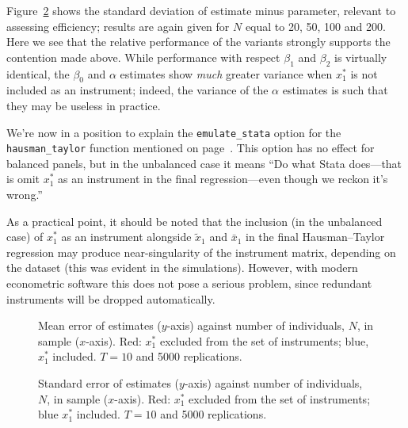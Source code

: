 \documentclass{article}
\begin{document}
Figure~\ref{fig:sds} shows the standard deviation of estimate minus
parameter, relevant to assessing efficiency; results are again given
for $N$ equal to 20, 50, 100 and 200.  Here we see that the relative
performance of the variants strongly supports the contention made
above. While performance with respect $\beta_1$ and $\beta_2$ is
virtually identical, the $\beta_0$ and $\alpha$ estimates show
\textit{much} greater variance when $x_1^*$ is not included as an
instrument; indeed, the variance of the $\alpha$ estimates is
such that they may be useless in practice.

We're now in a position to explain the \texttt{emulate\_stata} option
for the \texttt{hausman\_taylor} function mentioned on
page~\pageref{stata1}.\label{stata2} This option has no effect for
balanced panels, but in the unbalanced case it means ``Do what Stata
does---that is omit $x_1^*$ as an instrument in the final
regression---even though we reckon it's wrong.''

As a practical point, it should be noted that the inclusion (in the
unbalanced case) of $x_1^*$ as an instrument alongside $\tilde{x}_1$
and $\bar{x}_1$ in the final Hausman--Taylor regression may produce
near-singularity of the instrument matrix, depending on the dataset
(this was evident in the simulations). However, with modern
econometric software this does not pose a serious problem, since
redundant instruments will be dropped automatically.


\begin{figure}[p]
  \centering

\caption{Mean error of estimates ($y$-axis) against number of individuals,
$N$, in sample ($x$-axis).
{\color{red} Red}: $x_1^*$ excluded from the set of instruments;
{\color{blue} blue}, $x_1^*$ included.
$T = 10$ and 5000 replications.}
\label{fig:means}
\end{figure}

\begin{figure}[p]
  \centering

\caption{Standard error of estimates ($y$-axis) against number of individuals,
$N$, in sample ($x$-axis).
{\color{red} Red}: $x_1^*$ excluded from the set of instruments;
{\color{blue} blue} $x_1^*$ included.
$T = 10$ and 5000 replications.}
\label{fig:sds}
\end{figure}



\end{document}
